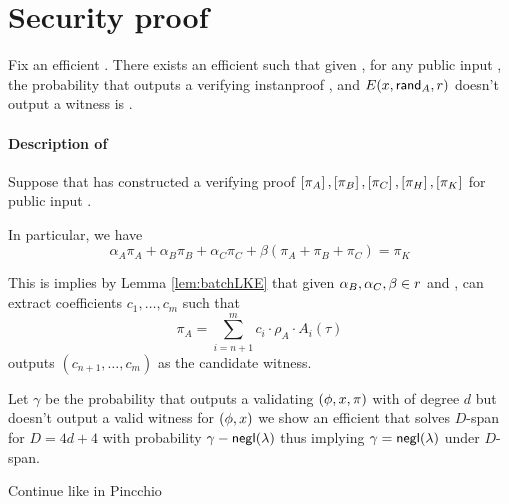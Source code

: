 \documentclass[11pt]{article}
\numberwithin{figure}{section} %
\begin{document}
 
 \section{Security proof}
 Fix an efficient \adv. There exists an efficient \ext such that given \trapdoor,
 for any public input \inp, the probability that \adv outputs a verifying instanproof \prf, and $E(x,\mathsf{rand}_{A},r)$
 doesn't output a witness \wit is \negl.
 \paragraph{Description of \ext}
 Suppose that \adv has constructed a verifying proof $\left[\pi_A\right],\left[\pi_B\right],\left[\pi_C\right],\left[\pi_H\right],\left[\pi_K\right]$ for public input \inp.
 
 In particular, we have
 \[\alpha_A \pi_A + \alpha_B \pi_B + \alpha_C\pi_C+  \beta(\pi_A + \pi_B + \pi_C) = \pi_K\]
 
 This is implies by Lemma \ref{lem:batchLKE} that given $\alpha_B,\alpha_C,\beta\in r$
 and \advrand, \ext can extract coefficients $c_1,\ldots,c_m$ such that
 \[\pi_A = \sum_{i= n+1}^m c_i\cdot \rho_A \cdot A_i(\tau)\]
 \ext outputs $(c_{n+1},\ldots,c_m)$ as the candidate witness.
 
 Let $\gamma$ be the probability that \adv outputs a validating $(\phi,x,\pi)$ with \inst of degree $d$ but 
 \ext doesn't output a valid witness \wit for $(\phi,x)$ we show an efficient \advprime 
 that solves $D$-span for $D=4d+4$ with probability $\gamma-\mathsf{negl}(\lambda)$ thus implying $\gamma=\mathsf{negl}(\lambda)$ under $D$-span.
 
 Continue like in Pincchio
 


\end{document}
